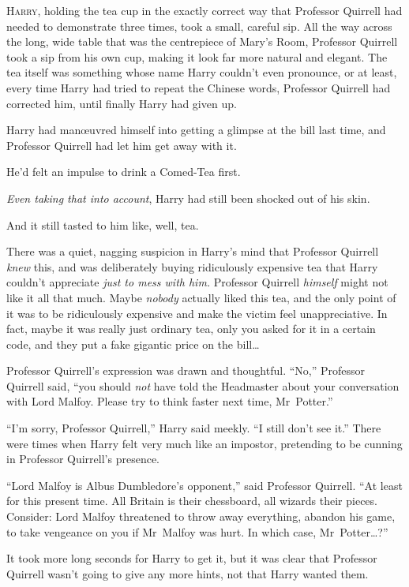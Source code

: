 
\lettrine{H}{arry}, holding the tea cup in the exactly correct way that Professor Quirrell had needed to demonstrate three times, took a small, careful sip. All the way across the long, wide table that was the centrepiece of Mary’s Room, Professor Quirrell took a sip from his own cup, making it look far more natural and elegant. The tea itself was something whose name Harry couldn’t even pronounce, or at least, every time Harry had tried to repeat the Chinese words, Professor Quirrell had corrected him, until finally Harry had given up.

Harry had manœuvred himself into getting a glimpse at the bill last time, and Professor Quirrell had let him get away with it.

He’d felt an impulse to drink a Comed-Tea first.

\emph{Even taking that into account}, Harry had still been shocked out of his skin.

And it still tasted to him like, well, tea.

There was a quiet, nagging suspicion in Harry’s mind that Professor Quirrell \emph{knew} this, and was deliberately buying ridiculously expensive tea that Harry couldn’t appreciate \emph{just to mess with him.} Professor Quirrell \emph{himself} might not like it all that much. Maybe \emph{nobody} actually liked this tea, and the only point of it was to be ridiculously expensive and make the victim feel unappreciative. In fact, maybe it was really just ordinary tea, only you asked for it in a certain code, and they put a fake gigantic price on the bill…

Professor Quirrell’s expression was drawn and thoughtful. “No,” Professor Quirrell said, “you should \emph{not} have told the Headmaster about your conversation with Lord Malfoy. Please try to think faster next time, Mr~Potter.”

“I’m sorry, Professor Quirrell,” Harry said meekly. “I still don’t see it.” There were times when Harry felt very much like an impostor, pretending to be cunning in Professor Quirrell’s presence.

“Lord Malfoy is Albus Dumbledore’s opponent,” said Professor Quirrell. “At least for this present time. All Britain is their chessboard, all wizards their pieces. Consider: Lord Malfoy threatened to throw away everything, abandon his game, to take vengeance on you if Mr~Malfoy was hurt. In which case, Mr~Potter…?”

It took more long seconds for Harry to get it, but it was clear that Professor Quirrell wasn’t going to give any more hints, not that Harry wanted them.

